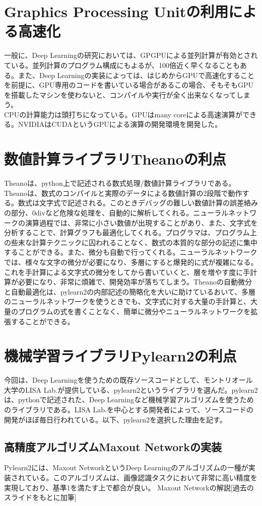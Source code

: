 \section{Graphics Processing Unitの利用による高速化}
一般に、Deep Learningの研究においては、GPGPUによる並列計算が有効とされている。並列計算のプログラム構成にもよるが、100倍近く早くなることもある。また、Deep Learningの実装によっては、はじめからGPUで高速化することを前提に、GPU専用のコードを書いている場合があるこの場合、そもそもGPUを搭載したマシンを使わないと、コンパイルや実行が全く出来なくなってしまう。\\
CPUの計算能力は頭打ちになっている。GPUはmany coreによる高速演算ができる。NVIDIAはCUDAというGPUによる演算の開発環境を開発した。
\section{数値計算ライブラリTheanoの利点}
Theanoは、python上で記述される数式処理/数値計算ライブラリである。Theanoは、数式のコンパイルと実際のデータによる数値計算の2段階で動作する。数式は文字式で記述される。このときデバッグの難しい数値計算の誤差絡みの部分、0divなど危険な処理を、自動的に解析してくれる。ニューラルネットワークの演算過程では、非常に小さい数値が出現することがあり、また、文字式を分析することで、計算グラフも最適化してくれる。プログラマは、プログラム上の些末な計算テクニックに囚われることなく、数式の本質的な部分の記述に集中することができる。また、微分も自動で行ってくれる。ニューラルネットワークでは、様々な文字の微分が必要になり、多層にすると爆発的に式が複雑になる。これを手計算による文字式の微分をしてから書いていくと、層を増やす度に手計算が必要になり、非常に煩雑で、開発効率が落ちてしまう。Theanoの自動微分と自動最適化は、pylearn2の内部記述の簡略化を大いに助けているおいて、多層のニューラルネットワークを使うときでも、文字式に対する大量の手計算と、大量のプログラムの式を書くことなく、簡単に微分やニューラルネットワークを拡張することができる。
\section{機械学習ライブラリPylearn2の利点}
今回は、Deep Learningを使うための既存ソースコードとして、モントリオール大学のLISA Lab.が提供している、pylearn2というライブラリを選んだ。pylearn2は、pythonで記述された、Deep Learningなど機械学習アルゴリズムを使うためのライブラリである。LISA Lab.を中心とする開発者によって、ソースコードの開発がほぼ毎日行われている。以下、pylearn2を選択した理由を記す。
\subsection{高精度アルゴリズムMaxout Networkの実装}
Pylearn2には、Maxout NetworkというDeep Learningのアルゴリズムの一種が実装されている。このアルゴリズムは、画像認識タスクにおいて非常に高い精度を実現しており、基準1を満たす上で都合が良い。
Maxout Networkの解説[過去のスライドをもとに加筆]

